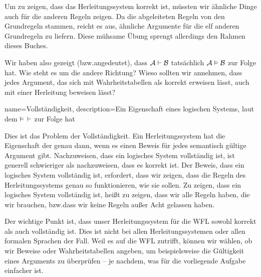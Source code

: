Um zu zeigen, dass das Herleitungssystem korrekt ist, müssten wir ähnliche Dinge auch für die anderen Regeln zeigen. Da die abgeleiteten Regeln von den Grundregeln stammen, reicht es aus, ähnliche Argumente für die elf anderen Grundregeln zu liefern. Diese mühsame Übung sprengt allerdings den Rahmen dieses Buches.

Wir haben also gezeigt (bzw.\@ angedeutet), dass $\mathcal{A} \vdash \mathcal{B}$ tatsächlich  $\mathcal{A} \vDash \mathcal{B}$ zur Folge hat. Wie steht es um die andere Richtung? Wieso sollten wir annehmen, dass jedes Argument, das sich mit Wahrheitstabellen als korrekt erweisen lässt, auch mit einer Herleitung beweisen lässt? 

{
name=Vollständigkeit,
description={Ein Eigenschaft eines logischen Systems, laut dem $\vDash$ $\vdash$ zur Folge hat}
}

Dies ist das Problem der Vollständigkeit. Ein Herleitungssystem hat die Eigenschaft der   genau dann, wenn es einen Beweis für jedes semantisch gültige Argument gibt. Nachzuweisen, dass ein logisches System vollständig ist, ist generell schwieriger als nachzuweisen, dass es korrekt ist. Der Beweis, dass ein logisches System vollständig ist, erfordert, dass wir zeigen, dass die Regeln des Herleitungssystems genau so funktionieren, wie sie sollen. Zu zeigen, dass ein logisches System vollständig ist, hei{\ss}t zu zeigen, dass wir alle Regeln haben, die wir brauchen, bzw.\@ dass wir keine Regeln au{\ss}er Acht gelassen haben.

Der wichtige Punkt ist, dass unser Herleitungssystem für die WFL sowohl korrekt als auch vollständig ist. Dies ist nicht bei allen Herleitungssystemen oder allen formalen Sprachen der Fall. Weil es auf die WFL zutrifft, können wir wählen, ob wir Beweise oder Wahrheitstabellen angeben, um beispielsweise die Gültigkeit eines Arguments zu überprüfen -- je nachdem, was für die vorliegende Aufgabe einfacher ist.


